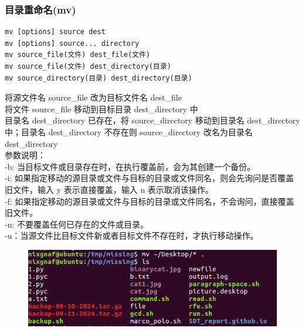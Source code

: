 \documentclass{article}
\begin{document}
\subsubsection{目录重命名(mv)}
\begin{lstlisting}[style=myStyle]
mv [options] source dest
mv [options] source... directory
mv source_file(文件) dest_file(文件)
mv source_file(文件) dest_directory(目录)
mv source_directory(目录) dest_directory(目录)
\end{lstlisting}
将源文件名 source\_file 改为目标文件名 dest\_file\\
将文件 source\_file 移动到目标目录 dest\_directory 中\\
目录名 dest\_directory 已存在，将 source\_directory 移动到目录名 dest\_directory 中；目录名 dest\_directory 不存在则 source\_directory 改名为目录名 dest\_directory\\
参数说明：\\
-b: 当目标文件或目录存在时，在执行覆盖前，会为其创建一个备份。\\
-i: 如果指定移动的源目录或文件与目标的目录或文件同名，则会先询问是否覆盖旧文件，输入 y 表示直接覆盖，输入 n 表示取消该操作。\\
-f: 如果指定移动的源目录或文件与目标的目录或文件同名，不会询问，直接覆盖旧文件。\\
-n: 不要覆盖任何已存在的文件或目录。\\
-u：当源文件比目标文件新或者目标文件不存在时，才执行移动操作。\\
\begin{figure}[h]
    \centering
    \includegraphics[width=0.5\linewidth]{image13.png}
\end{figure}
\end{document}
